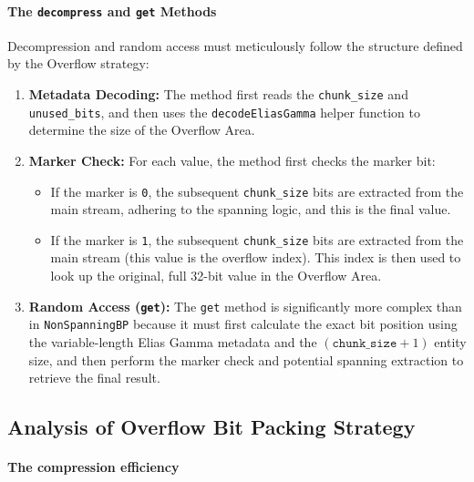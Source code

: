 \documentclass[11pt, a4paper]{article}
\begin{document}
\paragraph{The \texttt{decompress} and \texttt{get} Methods}
Decompression and random access must meticulously follow the structure defined by the Overflow strategy:

\begin{enumerate}
	\item \textbf{Metadata Decoding:} The method first reads the \texttt{chunk\_size} and \texttt{unused\_bits}, and then uses the \texttt{decodeEliasGamma} helper function to determine the size of the Overflow Area.
	\item \textbf{Marker Check:} For each value, the method first checks the marker bit:
	\begin{itemize}
		\item If the marker is \texttt{0}, the subsequent \texttt{chunk\_size} bits are extracted from the main stream, adhering to the spanning logic, and this is the final value.
		\item If the marker is \texttt{1}, the subsequent \texttt{chunk\_size} bits are extracted from the main stream (this value is the overflow index). This index is then used to look up the original, full 32-bit value in the Overflow Area.
	\end{itemize}
	\item \textbf{Random Access (\texttt{get}):} The \texttt{get} method is significantly more complex than in \texttt{NonSpanningBP} because it must first calculate the exact bit position using the variable-length Elias Gamma metadata and the $ (\texttt{chunk\_size} + 1) $ entity size, and then perform the marker check and potential spanning extraction to retrieve the final result.
\end{enumerate}

	
	\subsection{Analysis of Overflow Bit Packing Strategy}
	
	
	\paragraph{The compression efficiency}
	
\end{document}
